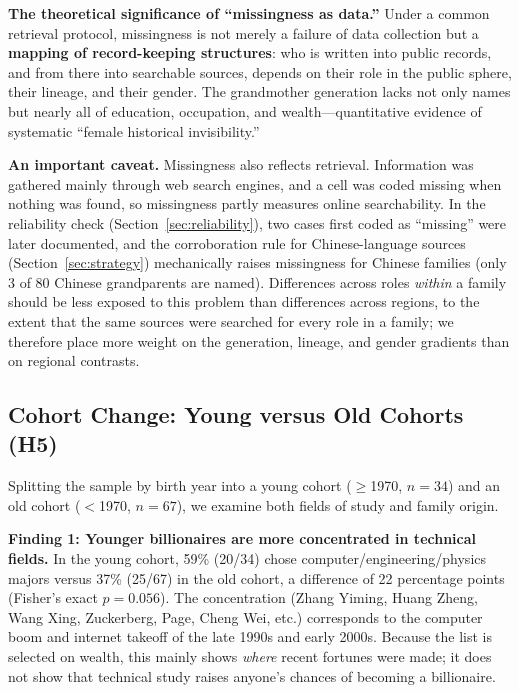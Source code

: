 \documentclass[11pt,a4paper]{article}
\begin{document}
\textbf{The theoretical significance of ``missingness as data.''} Under a common retrieval protocol, missingness is not merely a failure of data collection but a \textbf{mapping of record-keeping structures}: who is written into public records, and from there into searchable sources, depends on their role in the public sphere, their lineage, and their gender. The grandmother generation lacks not only names but nearly all of education, occupation, and wealth---quantitative evidence of systematic ``female historical invisibility.''

\textbf{An important caveat.} Missingness also reflects retrieval. Information was gathered mainly through web search engines, and a cell was coded missing when nothing was found, so missingness partly measures online searchability. In the reliability check (Section~\ref{sec:reliability}), two cases first coded as ``missing'' were later documented, and the corroboration rule for Chinese-language sources (Section~\ref{sec:strategy}) mechanically raises missingness for Chinese families (only 3 of 80 Chinese grandparents are named). Differences across roles \emph{within} a family should be less exposed to this problem than differences across regions, to the extent that the same sources were searched for every role in a family; we therefore place more weight on the generation, lineage, and gender gradients than on regional contrasts.

\subsection{Cohort Change: Young versus Old Cohorts (H5)}

Splitting the sample by birth year into a young cohort ($\geq$1970, $n=34$) and an old cohort ($<$1970, $n=67$), we examine both fields of study and family origin.

\textbf{Finding 1: Younger billionaires are more concentrated in technical fields.} In the young cohort, 59\% (20/34) chose computer/engineering/physics majors versus 37\% (25/67) in the old cohort, a difference of 22 percentage points (Fisher's exact $p=0.056$). The concentration (Zhang Yiming, Huang Zheng, Wang Xing, Zuckerberg, Page, Cheng Wei, etc.) corresponds to the computer boom and internet takeoff of the late 1990s and early 2000s. Because the list is selected on wealth, this mainly shows \emph{where} recent fortunes were made; it does not show that technical study raises anyone's chances of becoming a billionaire.
\end{document}
